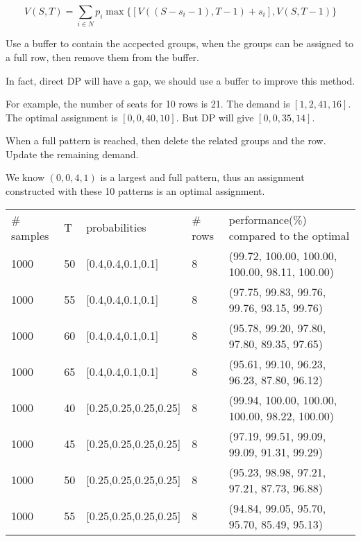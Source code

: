 $$V(S,T) = \sum_{i \in N} p_i \max\{ {[V((S-s_i-1),T-1)+ s_i]}, {V(S,T-1)}\}$$

Use a buffer to contain the accpected groups, when the groups can be assigned to a full row, then remove them from the buffer.

In fact, direct DP will have a gap, we should use a buffer to improve this method.

For example, the number of seats for 10 rows is 21. The demand is $[1,2,41,16]$. The optimal assignment is $[0, 0, 40, 10]$. But DP will give $[0, 0, 35, 14]$.

When a full pattern is reached, then delete the related groups and the row. Update the remaining demand.

We know $(0,0,4,1)$ is a largest and full pattern, thus an assignment constructed with these 10 patterns is an optimal assignment.

\begin{table}[ht]
  \begin{tabular}{l|l|l|l|l}
  \hline
  \# samples & T & probabilities & \# rows & performance(\%) compared to the optimal \\
  1000  & 50  & [0.4,0.4,0.1,0.1] & 8 & (99.72, 100.00, 100.00, 100.00, 98.11, 100.00) \\
  1000  & 55  & [0.4,0.4,0.1,0.1] & 8 & (97.75, 99.83, 99.76, 99.76, 93.15, 99.76) \\ %
  1000  & 60  & [0.4,0.4,0.1,0.1] & 8 & (95.78, 99.20, 97.80, 97.80, 89.35, 97.65) \\
  1000  & 65  & [0.4,0.4,0.1,0.1] & 8 & (95.61, 99.10, 96.23, 96.23, 87.80, 96.12) \\
  \hline
  1000  & 40  & [0.25,0.25,0.25,0.25] & 8 & (99.94, 100.00, 100.00, 100.00, 98.22, 100.00) \\
  1000  & 45  & [0.25,0.25,0.25,0.25] & 8 & (97.19, 99.51, 99.09, 99.09, 91.31, 99.29) \\
  1000  & 50  & [0.25,0.25,0.25,0.25] & 8 & (95.23, 98.98, 97.21, 97.21, 87.73, 96.88) \\
  1000  & 55  & [0.25,0.25,0.25,0.25] & 8 & (94.84, 99.05, 95.70, 95.70, 85.49, 95.13) \\
  \end{tabular}
\end{table}

\newpage
